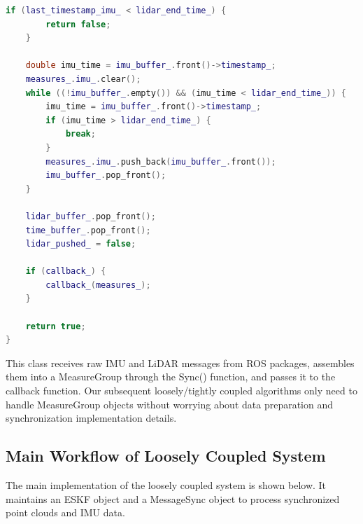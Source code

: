 \begin{lstlisting}[language=c++,caption=src/ch7/loosly_coupled_lio/measure_sync.h]
	if (last_timestamp_imu_ < lidar_end_time_) {
		return false;
	}
	
	double imu_time = imu_buffer_.front()->timestamp_;
	measures_.imu_.clear();
	while ((!imu_buffer_.empty()) && (imu_time < lidar_end_time_)) {
		imu_time = imu_buffer_.front()->timestamp_;
		if (imu_time > lidar_end_time_) {
			break;
		}
		measures_.imu_.push_back(imu_buffer_.front());
		imu_buffer_.pop_front();
	}
	
	lidar_buffer_.pop_front();
	time_buffer_.pop_front();
	lidar_pushed_ = false;
	
	if (callback_) {
		callback_(measures_);
	}
	
	return true;
}
\end{lstlisting}

This class receives raw IMU and LiDAR messages from ROS packages, assembles them into a MeasureGroup through the Sync() function, and passes it to the callback function. Our subsequent loosely/tightly coupled algorithms only need to handle MeasureGroup objects without worrying about data preparation and synchronization implementation details.

\subsection{Main Workflow of Loosely Coupled System}
The main implementation of the loosely coupled system is shown below. It maintains an ESKF object and a MessageSync object to process synchronized point clouds and IMU data.

